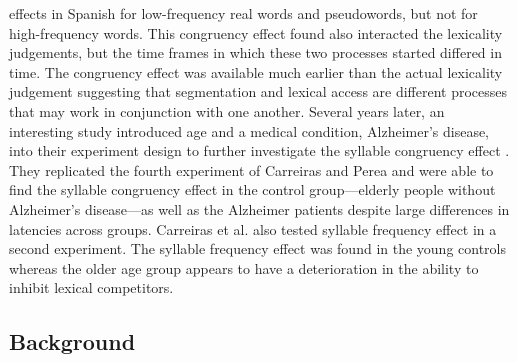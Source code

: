 \documentclass[
12pt, %
english, %
doublespacing, %
nolistspacing, %
liststotoc, %
headsepline, %
chapterinoneline, %
openany, %
]{DoctoralThesis}\usepackage[]{graphicx}\usepackage[]{color}
\begin{document}
effects in Spanish for low-frequency real words and pseudowords, but not for high-frequency words. This congruency effect found also interacted the lexicality judgements, but the time frames in which these two processes started differed in time. The congruency effect was available much earlier than the actual lexicality judgement suggesting that segmentation and lexical access are different processes that may work in conjunction with one another. Several years later, an interesting study introduced age and a medical condition, Alzheimer’s disease, into their experiment design to further investigate the syllable congruency effect \citep{Carreiras2008-ar}. They replicated the fourth experiment of Carreiras and Perea \parencite*{Carreiras2002-mp} and were able to find the syllable congruency effect in the control group—elderly people without Alzheimer’s disease—as well as the Alzheimer patients despite large differences in latencies across groups. Carreiras et al. \parencite*{Carreiras2008-ar} also tested syllable frequency effect in a second experiment. The syllable frequency effect was found in the young controls whereas the older age group appears to have a deterioration in the ability to inhibit lexical competitors.


\subsection{Background}


\end{document}
